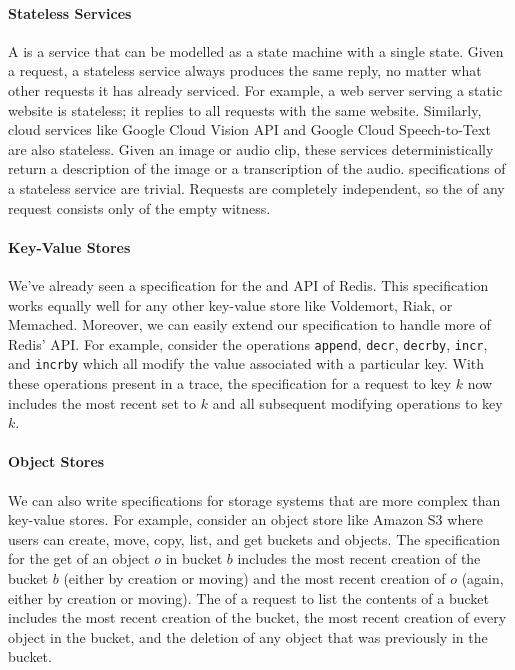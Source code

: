 \paragraph{Stateless Services}
A  is a service that can be modelled as a state
machine with a single state. Given a request, a stateless service always
produces the same reply, no matter what other requests it has already serviced.
For example, a web server serving a static website is stateless; it replies to
all requests with the same website. Similarly, cloud services like Google Cloud
Vision API and Google Cloud Speech-to-Text are also stateless. Given an image
or audio clip, these services deterministically return a description of the
image or a transcription of the audio. \Watprovenance{} specifications of a
stateless service are trivial. Requests are completely independent, so the
\watprovenance{} of any request consists only of the empty witness.

\paragraph{Key-Value Stores}
We've already seen a \watprovenance{} specification for the \kvget{} and
\kvset{} API of Redis. This specification works equally well for any other
key-value store like Voldemort, Riak, or Memached. Moreover, we can easily
extend our \watprovenance{} specification to handle more of Redis' API. For
example, consider the operations \texttt{append}, \texttt{decr},
\texttt{decrby}, \texttt{incr}, and \texttt{incrby} which all modify the value
associated with a particular key. With these operations present in a trace, the
\watprovenance{} specification for a \kvget{} request to key $k$ now includes
the most recent set to $k$ and all subsequent modifying operations to key $k$.

\paragraph{Object Stores}
We can also write \watprovenance{} specifications for storage systems that are
more complex than key-value stores. For example, consider an object store like
Amazon S3 where users can create, move, copy, list, and get buckets and
objects. The \watprovenance{} specification for the get of an object $o$ in
bucket $b$ includes the most recent creation of the bucket $b$ (either by
creation or moving) and the most recent creation of $o$ (again, either by
creation or moving). The \watprovenance{} of a request to list the contents of
a bucket includes the most recent creation of the bucket, the most recent
creation of every object in the bucket, and the deletion of any object that was
previously in the bucket.

